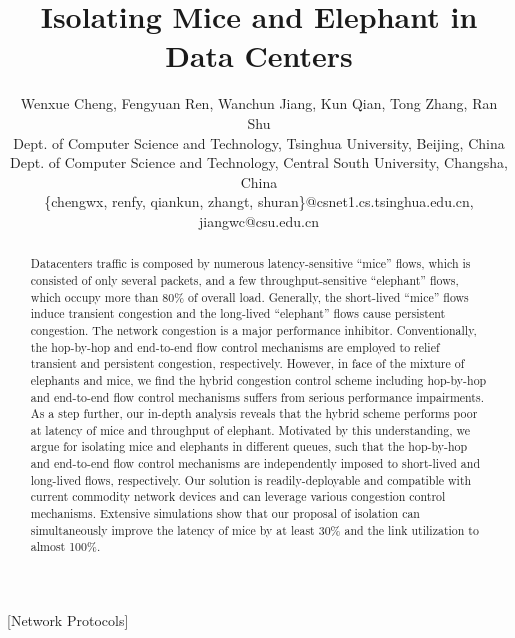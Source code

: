 \documentclass[]{sig-alternate-10pt}
\begin{document}
\title{Isolating Mice and Elephant in Data Centers}
\author{Wenxue Cheng, Fengyuan Ren,  Wanchun Jiang, Kun Qian, Tong Zhang, Ran Shu\\
Dept. of Computer Science and Technology, Tsinghua University, Beijing, China\\
Dept. of Computer Science and Technology, Central South University, Changsha, China\\
\{chengwx, renfy, qiankun, zhangt, shuran\}@csnet1.cs.tsinghua.edu.cn, 
jiangwc@csu.edu.cn
}
\maketitle

\begin{abstract}
Datacenters traffic is composed by numerous latency-sensitive ``mice'' flows, which is consisted of only several packets, and a few throughput-sensitive ``elephant'' flows, which occupy more than 80\% of overall load. Generally, the  short-lived ``mice'' flows induce transient congestion and the long-lived ``elephant'' flows cause persistent congestion. The network congestion is a major performance inhibitor. Conventionally, the hop-by-hop and end-to-end flow control mechanisms are employed to relief transient and persistent congestion, respectively. However, in face of the mixture of elephants and mice, we find the hybrid congestion control scheme including hop-by-hop and end-to-end flow control mechanisms suffers from serious performance impairments. As a step further, our in-depth analysis reveals that the hybrid scheme performs poor at latency of mice and throughput of elephant. Motivated by this understanding, we argue for isolating mice and elephants in different queues, such that the hop-by-hop and end-to-end flow control mechanisms are independently imposed to short-lived and long-lived flows, respectively. Our solution is readily-deployable and compatible with current commodity network devices and can leverage various congestion control mechanisms. Extensive simulations show that our proposal of isolation can simultaneously improve the latency of mice by at least 30\% and the link utilization to almost 100\%.
\end{abstract}
[Network Protocols]

\end{document}
